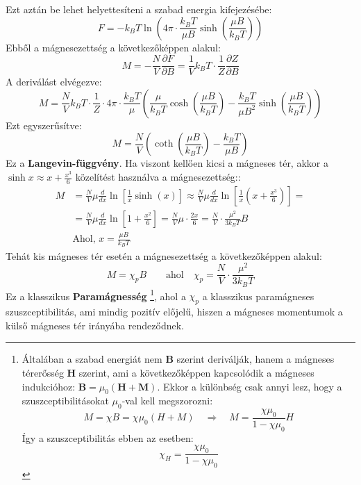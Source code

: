 \documentclass[../main.tex]{subfiles}
\begin{document}
Ezt aztán be lehet helyettesíteni a szabad energia kifejezésébe:
\begin{equation}
    F = - k_B T \ln \left( 4\pi \cdot \frac{k_B T}{\mu B} \sinh \left( \frac{\mu B}{k_B T} \right) \right)
\end{equation}
Ebből a mágnesezettség a következőképpen alakul:
\begin{equation}
    M = - \frac{N}{V} \frac{\partial F}{\partial B} = \frac{1}{V} k_B T \cdot \frac{1}{Z} \frac{\partial Z}{\partial B}
\end{equation}
A deriválást elvégezve:
\begin{equation}
    M = \frac{N}{V} k_B T \cdot \frac{1}{Z} \cdot 4\pi \cdot \frac{k_B T}{\mu} \left( \frac{\mu}{k_B T} \cosh \left( \frac{\mu B}{k_B T} \right) - \frac{k_B T}{\mu B^2} \sinh \left( \frac{\mu B}{k_B T} \right) \right)
\end{equation}
Ezt egyszerűsítve:
\begin{equation}
    M = \frac{N}{V} \left( \coth \left(\frac{\mu B}{k_B T} \right) - \frac{k_B T}{\mu B} \right)
\end{equation}
Ez a \textbf{Langevin-függvény}. Ha viszont kellően kicsi a mágneses tér, akkor a $\sinh x \approx x + \frac{x^3}{6}$ közelítést használva a mágnesezettség::
\begin{equation}
    \begin{aligned}
        M &= \frac{N}{V} \mu \frac{d}{dx} \ln \left[\frac{1}{x} \sinh(x)\right] \approx \frac{N}{V} \mu \frac{d}{dx} \ln \left[\frac{1}{x} \left(x + \frac{x^3}{6}\right)\right] = \\
        &= \frac{N}{V} \mu \frac{d}{dx} \ln \left[1 + \frac{x^2}{6}\right] = \frac{N}{V} \mu \cdot \frac{2x}{6} = \frac{N}{V} \cdot \frac{\mu^2}{3 k_B T} B \\
        &\text{Ahol, } x = \frac{\mu B}{k_B T}
    \end{aligned}
\end{equation}
Tehát kis mágneses tér esetén a mágnesezettség a következőképpen alakul:
\begin{equation}
    \boxed{M = \chi_p B \qquad \text{ahol} \quad \chi_p = \frac{N}{V} \cdot \frac{\mu^2}{3 k_B T}}
\end{equation}
Ez a klasszikus \textbf{Paramágnesség}
\footnote{
    Általában a szabad energiát nem $\mathbf{B}$ szerint deriválják, hanem a mágneses térerősség $\mathbf{H}$ szerint, ami a következőképpen kapcsolódik a mágneses indukcióhoz: $\mathbf{B} = \mu_0 (\mathbf{H} + \mathbf{M})$. Ekkor
    a különbség csak annyi lesz, hogy a szuszceptibilitásokat $\mu_0$-val kell megszorozni:
    \begin{equation*}
        M = \chi B = \chi \mu_0 (H + M) \quad \Rightarrow \quad M = \frac{\chi \mu_0}{1 - \chi \mu_0} H
    \end{equation*}
    Így a szuszceptibilitás ebben az esetben:
    \begin{equation*}
        \chi_H = \frac{\chi \mu_0}{1 - \chi \mu_0}
    \end{equation*}
}, ahol a $\chi_p$ a klasszikus paramágneses szuszceptibilitás, ami mindig pozitív előjelű, hiszen a mágneses momentumok a külső mágneses tér irányába rendeződnek.
\end{document}
